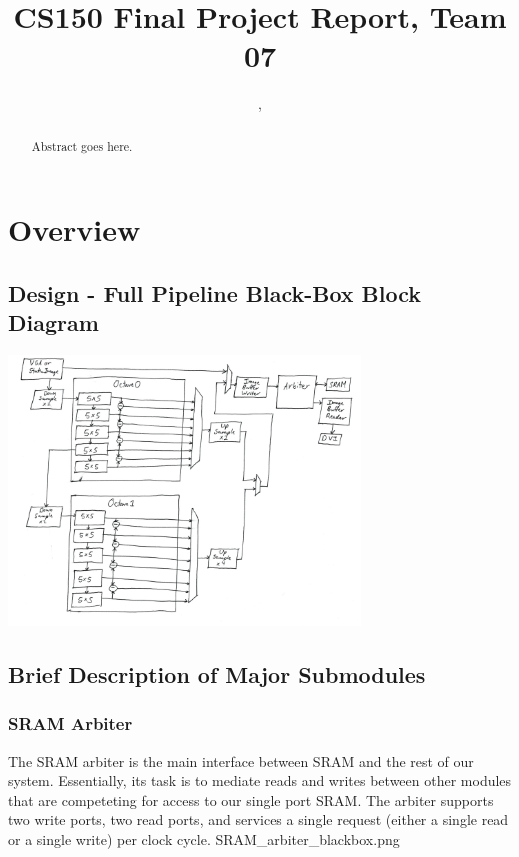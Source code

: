 \documentclass[12pt]{article}
\title{CS150 Final Project Report, Team 07}
\author{\Name, \texttt{\Login}}
\begin{document}
\maketitle

\begin{abstract}

Abstract goes here.

\end{abstract}

\newpage

\section{Overview}

\subsection{Design - Full Pipeline Black-Box Block Diagram}

\includegraphics[width=0.7\textwidth]{processed_image_pngs/full_pipe_blackbox.png}

\subsection{Brief Description of Major Submodules}

\subsubsection{SRAM Arbiter}

The SRAM arbiter is the main interface between SRAM and the rest of our system.
Essentially, its task is to mediate reads and writes between other modules that
are competeting for access to our single port SRAM. The arbiter supports two 
write ports, two read ports, and services a single request (either a single 
read or a single write) per clock cycle.
SRAM\_arbiter\_blackbox.png
\end{document}
